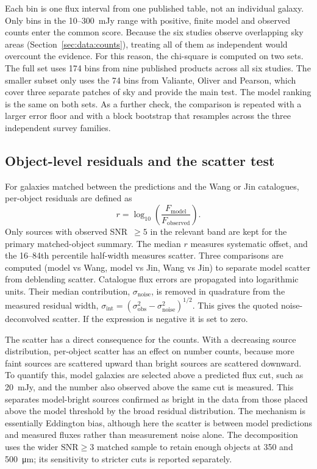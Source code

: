 \documentclass[12pt,a4paper]{article}
\begin{document}
Each bin is one flux interval from one published table, not an individual galaxy. Only
bins in the 10--\SI{300}{mJy} range with positive, finite model and observed counts enter
the common score.
Because the six studies observe overlapping sky areas
(Section~\ref{sec:data:counts}), treating all of them as independent would overcount
the evidence. For this reason, the chi-square is computed on two sets. The full set uses
174 bins from nine published products across all six studies. The smaller subset only uses
the 74 bins from Valiante, Oliver
and Pearson, which cover three separate patches of sky and provide the
main test. The model ranking is the same on both sets. As a further check, the
comparison is repeated with a larger error floor and with a block bootstrap that
resamples across the three independent survey families.

\subsection{Object-level residuals and the scatter test}
\label{sec:methods:scatter}

For galaxies matched between the \popcosmos{} predictions and the Wang or Jin
catalogues, per-object residuals are defined as
\begin{equation}
  r = \log_{10}\!\left(\frac{F_\mathrm{model}}{F_\mathrm{observed}}\right).
\end{equation}
Only sources with observed SNR~$\geq 5$ in the relevant band are kept for the primary
matched-object summary. The median
$r$ measures systematic offset, and the 16--84th percentile half-width measures
scatter. Three comparisons are computed (model vs Wang, model vs Jin, Wang vs
Jin) to separate model scatter from deblending scatter. Catalogue flux errors are
propagated into logarithmic units. Their median contribution, $\sigma_\mathrm{noise}$,
is removed in quadrature from the measured residual width,
$\sigma_\mathrm{int}=(\sigma_\mathrm{obs}^2-\sigma_\mathrm{noise}^2)^{1/2}$. This gives
the quoted noise-deconvolved scatter. If the expression is negative it is set to zero.

The scatter has a direct consequence for the counts. With a decreasing source
distribution, per-object scatter has an effect on number
counts, because more faint sources are scattered upward than bright sources are
scattered downward. To quantify this, model galaxies are selected above a predicted
flux cut, such as \SI{20}{mJy}, and the number also observed above the same cut is
measured. This separates model-bright sources confirmed as bright in the data from
those placed above the model threshold by the broad residual distribution. The
mechanism is essentially
Eddington bias, although here the scatter is between model predictions and measured
fluxes rather than measurement noise alone. The decomposition uses the wider
$\mathrm{SNR}\geq3$ matched sample to retain enough objects at 350 and
\SI{500}{\um}; its sensitivity to stricter cuts is reported separately.
\end{document}
